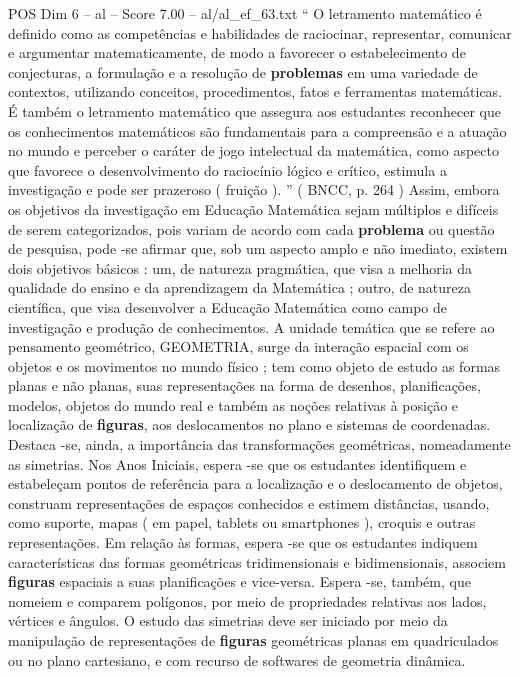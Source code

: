 \begin{textsample}{POS Dim 6 – al – Score 7.00 – al/al\_ef\_63.txt}  \label{ex:f6_pos_227}
“ O letramento matemático é definido como as competências e habilidades de raciocinar, representar, comunicar e argumentar matematicamente, de modo a favorecer o estabelecimento de conjecturas, a formulação e a resolução de \textbf{problemas} em uma variedade de contextos, utilizando conceitos, procedimentos, fatos e ferramentas matemáticas.
É também o letramento matemático que assegura aos estudantes reconhecer que os conhecimentos matemáticos são fundamentais para a compreensão e a atuação no mundo e perceber o caráter de jogo intelectual da matemática, como aspecto que favorece o desenvolvimento do raciocínio lógico e crítico, estimula a investigação e pode ser prazeroso ( fruição ). ” ( BNCC, p. 264 ) Assim, embora os objetivos da investigação em Educação Matemática sejam múltiplos e difíceis de serem categorizados, pois variam de acordo com cada \textbf{problema} ou questão de pesquisa, pode -se afirmar que, sob um aspecto amplo e não imediato, existem dois objetivos básicos : um, de natureza pragmática, que visa a melhoria da qualidade do ensino e da aprendizagem da Matemática ; outro, de natureza científica, que visa desenvolver a Educação Matemática como campo de investigação e produção de conhecimentos.
A unidade temática que se refere ao pensamento geométrico, GEOMETRIA, surge da interação espacial com os objetos e os movimentos no mundo físico ; tem como objeto de estudo as formas planas e não planas, suas representações na forma de desenhos, planificações, modelos, objetos do mundo real e também as noções relativas à posição e localização de \textbf{figuras}, aos deslocamentos no plano e sistemas de coordenadas.
Destaca -se, ainda, a importância das transformações geométricas, nomeadamente as simetrias.
Nos Anos Iniciais, espera -se que os estudantes identifiquem e estabeleçam pontos de referência para a localização e o deslocamento de objetos, construam representações de espaços conhecidos e estimem distâncias, usando, como suporte, mapas ( em papel, tablets ou smartphones ), croquis e outras representações.
Em relação às formas, espera -se que os estudantes indiquem características das formas geométricas tridimensionais e bidimensionais, associem \textbf{figuras} espaciais a suas planificações e vice-versa.
Espera -se, também, que nomeiem e comparem polígonos, por meio de propriedades relativas aos lados, vértices e ângulos.
O estudo das simetrias deve ser iniciado por meio da manipulação de representações de \textbf{figuras} geométricas planas em quadriculados ou no plano cartesiano, e com recurso de softwares de geometria dinâmica.

\end{textsample}

